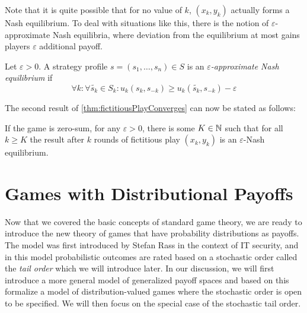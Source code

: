 \documentclass[a4paper]{scrreprt}
\let\epsilon\varepsilon
\begin{document}
    Note that it is quite possible that for no value of $k$, $(x_k, y_k)$ actually forms a Nash equilibrium.
    To deal with situations like this, there is the notion of $\epsilon$-approximate Nash equilibria, where deviation from the equilibrium at most gains players $\epsilon$ additional payoff.
        
    \begin{defn}
        Let $\epsilon > 0$.
        A strategy profile $s = (s_1, \dots, s_n) \in S$ is an \emph{$\epsilon$-approximate Nash equilibrium} if
        \[
            \forall k: \forall \tilde{s_k} \in S_k: u_k(s_k, s_{-k}) \geq u_k(\tilde{s_k}, s_{-k}) - \epsilon
        \]
    \end{defn}

    The second result of \ref{thm:fictitiousPlayConverges} can now be stated as follows:
    \begin{cor}
        If the game is zero-sum, for any $\epsilon > 0$, there is some $K \in \mathbb{N}$ such that for all $k \geq K$ the result after $k$ rounds of fictitious play $(x_k, y_k)$ is an $\epsilon$-Nash equilibrium.
    \end{cor}

    
    
    
    
    
    
    \chapter{Games with Distributional Payoffs}
    Now that we covered the basic concepts of standard game theory, we are ready to introduce the new theory of games that have probability distributions as payoffs.
    The model was first introduced by Stefan Rass %
    in the context of IT security, and in this model probabilistic outcomes are rated based on a stochastic order called the \emph{tail order} which we will introduce later.
    In our discussion, we will first introduce a more general model of generalized payoff spaces and based on this formalize a model of distribution-valued games where the stochastic order is open to be specified. We will then focus on the special case of the stochastic tail order.
    
\end{document}
